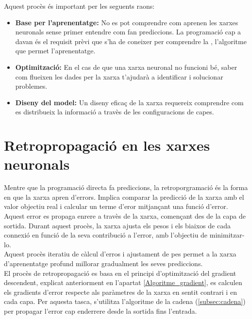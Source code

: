 Aquest procès és important per les seguents raons:
\begin{itemize}
 \item \textbf{Base per l'aprenentatge:} No es pot comprendre com aprenen les xarxes neuronals sense primer entendre com fan prediccions. La programació cap a davan és el requisit prèvi que s'ha de coneixer per comprendre la , l'algoritme que permet l'aprenentatge.
 \item \textbf{Optimització:} En el cas de que una xarxa neuronal no funcioni bé, saber com flueixen les dades per la xarxa t'ajudarà a identificar i solucionar problemes.
 \item \textbf{Diseny del model:} Un diseny eficaç de la xarxa requereix comprendre com es distribueix la informació a travès de les configuracions de capes.
\end{itemize}

\section{Retropropagació en les xarxes neuronals}\label{subsec:retropropagació}
Mentre que la programació directa fa prediccions, la retroporgramació és la forma en que la xarxa apren d'errors. Implica comparar la predicció de la xarxa amb el valor objectiu real i calcular un terme d'eror mitjançant una funció d'error.\\
Aquest error es propaga enrere a travès de la xarxa, començant des de la capa de sortida. Durant aquest procès, la xarxa ajusta els pesos i els biaixos de cada connexió en funció de la seva contribució a l'error, amb l'objectiu de minimitzar-lo.\\
Aquest procès iteratiu de càlcul d'erros i ajustament de pes permet a la xarxa d'aprenentatge profund millorar gradualment les seves prediccions.\\
El procès de retropropagació es basa en el principi d'optimització del gradient descendent, explicat anteriorment en l'apartat \ref{Algoritme_gradient}, es calculen els gradients d'error respecte als paràmetres de la xarxa en sentit contrari i en cada capa. Per aquesta tasca, s'utilitza l'algoritme de la cadena (\ref{subsec:cadena}) per propagar l'error cap enderrere desde la sortida fins l'entrada.

